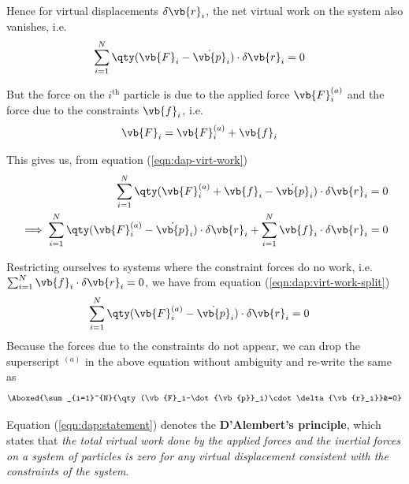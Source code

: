 Hence for virtual displacements $\delta{\vb{r}_i}$, the net virtual work on the system also vanishes, i.e.
\begin{align}
	\sum_{i=1}^{N}{\qty(\vb{F}_i-\dot{\vb{p}}_i)\cdot\delta{\vb{r}_i}}&=0 \label{eqn:dap-virt-work}
\end{align}

But the force on the $i^\text{th}$ particle is due to the applied force $\vb{F}_i^{(a)}$ and the force due to the constraints $\vb{f}_i$, i.e.
\begin{align*}
	\vb{F}_i&=\vb{F}_i^{(a)}+\vb{f}_i
\end{align*}

This gives us, from equation (\ref{eqn:dap-virt-work})
\begin{align}
	\sum_{i=1}^{N}{\qty(\vb{F}_i^{(a)}+\vb{f}_i-\dot{\vb{p}}_i)\cdot\delta{\vb{r}_i}}&=0 \nonumber\\
	\implies\sum_{i=1}^{N}{\qty(\vb{F}_i^{(a)}-\dot{\vb{p}}_i)\cdot\delta{\vb{r}_i}}+\sum_{i=1}^{N}{\vb{f}_i\cdot\delta{\vb{r}_i}}&=0 \label{eqn:dap:virt-work-split}
\end{align}

Restricting ourselves to systems where the constraint forces do no work, i.e. $\sum_{i=1}^{N}{\vb{f}_i\cdot\delta{\vb{r}_i}}=0$, we have from equation (\ref{eqn:dap:virt-work-split})
\begin{align*}
	\sum_{i=1}^{N}{\qty(\vb{F}_i^{(a)}-\dot{\vb{p}}_i)\cdot\delta{\vb{r}_i}}&=0
\end{align*}
Because the forces due to the constraints do not appear, we can drop the superscript $^{(a)}$ in the above equation without ambiguity and re-write the same as
\begin{align}
	\Aboxed{\sum_{i=1}^{N}{\qty(\vb{F}_i-\dot{\vb{p}}_i)\cdot\delta{\vb{r}_i}}&=0} \label{eqn:dap:statement}
\end{align}

Equation (\ref{eqn:dap:statement}) denotes the \textbf{D'Alembert's principle}, which states that \emph{the total virtual work done by the applied forces and the inertial forces on a system of particles is zero for any virtual displacement consistent with the constraints of the system}.